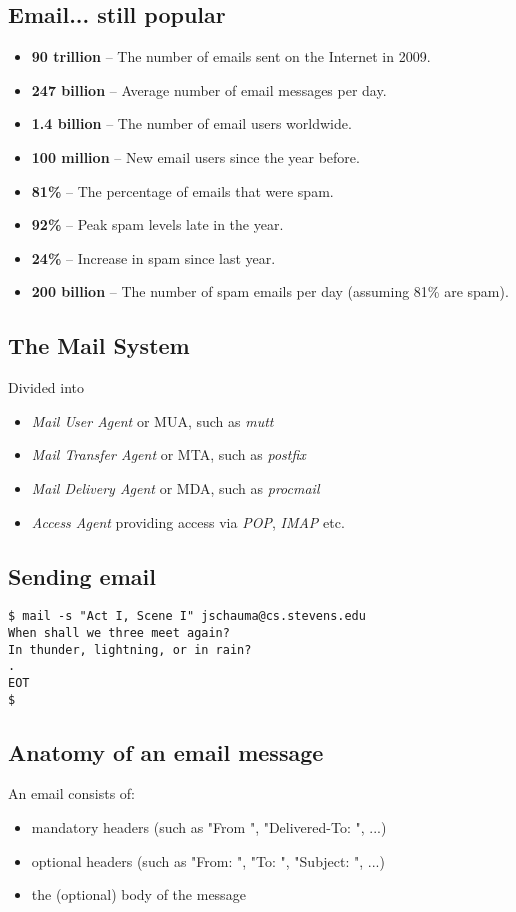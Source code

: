 \documentclass[xga]{xdvislides}
\begin{document}
\subsection{Email... still popular}
\begin{itemize}
	\item {\bf 90 trillion} – The number of emails sent on the Internet in 2009.
	\item {\bf 247 billion} – Average number of email messages per day.
	\item {\bf 1.4 billion} – The number of email users worldwide.
	\item {\bf 100 million} – New email users since the year before.
	\item {\bf 81\%} – The percentage of emails that were spam.
	\item {\bf 92\%} – Peak spam levels late in the year.
	\item {\bf 24\%} – Increase in spam since last year.
	\item {\bf 200 billion} – The number of spam emails per day (assuming 81\% are spam).
\end{itemize}

\subsection{The Mail System}
Divided into
\begin{itemize}
	\item {\em Mail User Agent} or MUA, such as {\em mutt}
	\item {\em Mail Transfer Agent} or MTA, such as {\em postfix}
	\item {\em Mail Delivery Agent} or MDA, such as {\em procmail}
	\item {\em Access Agent} providing access via {\em POP}, {\em IMAP} etc.
\end{itemize}


\subsection{Sending email}
\begin{verbatim}
$ mail -s "Act I, Scene I" jschauma@cs.stevens.edu
When shall we three meet again?
In thunder, lightning, or in rain?
.
EOT
$
\end{verbatim}

\subsection{Anatomy of an email message}
An email consists of:
\begin{itemize}
	\item mandatory headers (such as "From ", "Delivered-To: ", ...)
	\item optional headers (such as "From: ", "To: ", "Subject: ", ...)
	\item the (optional) body of the message
\end{itemize}
\end{document}
